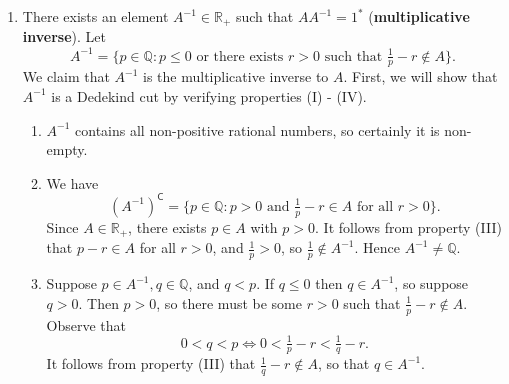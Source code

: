 \documentclass[12pt]{article}
\theoremstyle{definition}
\begin{document}
\begin{enumerate}[label = (M\arabic*)]
    \item There exists an element \( A^{-1} \in \mathbb{R}_+ \) such that \( AA^{-1} = 1^* \) (\textbf{multiplicative inverse}). Let
    \[
        A^{-1} = \{ p \in \mathbb{Q} : p \leq 0 \text{ or there exists } r > 0 \text{ such that } \tfrac{1}{p} - r \not\in A \}.
    \]
    We claim that \( A^{-1} \) is the multiplicative inverse to \( A \). First, we will show that \( A^{-1} \) is a Dedekind cut by verifying properties (I) - (IV).
    
    \begin{enumerate}[label = (\Roman*)]
        \item \( A^{-1} \) contains all non-positive rational numbers, so certainly it is non-empty.

        \item We have
        \[
            \left(A^{-1}\right)^{\mathsf{C}} = \{ p \in \mathbb{Q} : p > 0 \text{ and } \tfrac{1}{p} - r \in A \text{ for all } r > 0 \}.
        \]
        Since \( A \in \mathbb{R}_+ \), there exists \( p \in A \) with \( p > 0 \). It follows from property (III) that \( p - r \in A \) for all \( r > 0 \), and \( \tfrac{1}{p} > 0 \), so \( \tfrac{1}{p} \not\in A^{-1} \). Hence \( A^{-1} \neq \mathbb{Q} \).

        \item Suppose \( p \in A^{-1}, q \in \mathbb{Q} \), and \( q < p \). If \( q \leq 0 \) then \( q \in A^{-1} \), so suppose \( q > 0 \). Then \( p > 0 \), so there must be some \( r > 0 \) such that \( \tfrac{1}{p} - r \not\in A \). Observe that
        \[
            0 < q < p \iff 0 < \tfrac{1}{p} - r < \tfrac{1}{q} - r.
        \]
        It follows from property (III) that \( \tfrac{1}{q} - r \not\in A \), so that \( q \in A^{-1} \).


\end{enumerate}
\end{enumerate}
\end{document}
